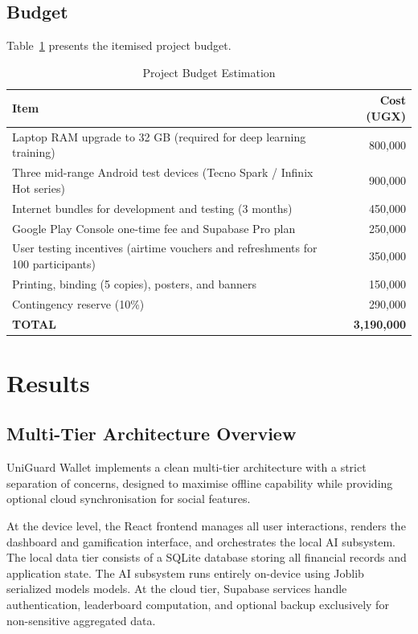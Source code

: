 \documentclass[12pt]{report}
\begin{document}
\section{Budget}

Table~\ref{tab:budget} presents the itemised project budget.

\begin{table}[H]
\centering
\caption{Project Budget Estimation}
\label{tab:budget}
\begin{tabular}{p{9cm} r}
\toprule
\textbf{Item} & \textbf{Cost (UGX)} \\
\midrule
Laptop RAM upgrade to 32 GB (required for deep learning training) & 800,000 \\
Three mid-range Android test devices (Tecno Spark / Infinix Hot series) & 900,000 \\
Internet bundles for development and testing (3 months) & 450,000 \\
Google Play Console one-time fee and Supabase Pro plan & 250,000 \\
User testing incentives (airtime vouchers and refreshments for 100 participants) & 350,000 \\
Printing, binding (5 copies), posters, and banners & 150,000 \\
Contingency reserve (10\%) & 290,000 \\
\midrule
\textbf{TOTAL} & \textbf{3,190,000} \\
\bottomrule
\end{tabular}
\end{table}



\chapter{Results}
\label{ch:chapter-04}
\section{Multi-Tier Architecture Overview}

UniGuard Wallet implements a clean multi-tier architecture with a strict separation of
concerns, designed to maximise offline capability while providing optional cloud
synchronisation for social features.

At the device level, the React frontend manages all user interactions, renders the
dashboard and gamification interface, and orchestrates the local AI subsystem. The
local data tier consists of a SQLite database storing all financial records and application
state. The AI subsystem runs entirely on-device using Joblib serialized models models. At the
cloud tier, Supabase services handle authentication, leaderboard computation, and
optional backup exclusively for non-sensitive aggregated data.
\end{document}
